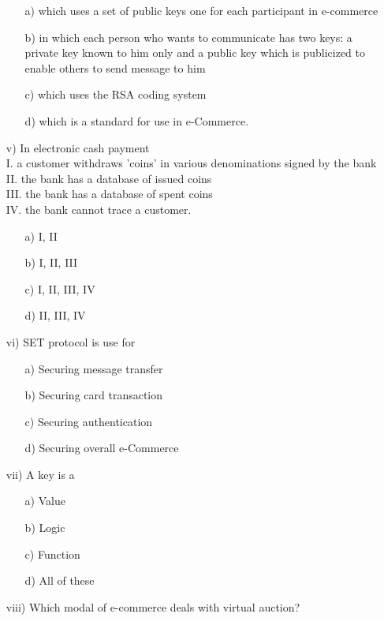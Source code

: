 \begin{enumerate}
\begin{enumerate}
        \item[a)] which uses a set of public keys one for each participant in e-commerce
        \item[b)] in which each person who wants to communicate has two keys: a private key known to him only and a public key which is publicized to enable others to send message to him
        \item[c)] which uses the RSA coding system
        \item[d)] which is a standard for use in e-Commerce.
    \end{enumerate}
    \item[v)] In electronic cash payment \\
    I. a customer withdraws 'coins' in various denominations signed by the bank \\
    II. the bank has a database of issued coins \\
    III. the bank has a database of spent coins \\
    IV. the bank cannot trace a customer.
    \begin{enumerate}
        \item[a)] I, II
        \item[b)] I, II, III
        \item[c)] I, II, III, IV
        \item[d)] II, III, IV
    \end{enumerate}
    \item[vi)] SET protocol is use for
    \begin{enumerate}
        \item[a)] Securing message transfer
        \item[b)] Securing card transaction
        \item[c)] Securing authentication
        \item[d)] Securing overall e-Commerce
    \end{enumerate}
    \item[vii)] A key is a
    \begin{enumerate}
        \item[a)] Value
        \item[b)] Logic
        \item[c)] Function
        \item[d)] All of these
    \end{enumerate}
    \item[viii)] Which modal of e-commerce deals with virtual auction?
    \begin{enumerate}

\end{enumerate}
\end{enumerate}
